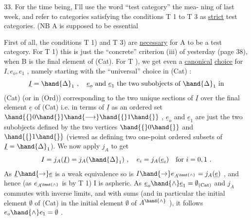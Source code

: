 33.   For the time being,  I'll use the word ``test category''  the mea-%
ning of last week,  and refer to categories satisfying the conditions
T 1 to  T 3  as \uline{strict}  test categories. (NB A is supposed to be essential

First of all,  the conditions T 1) and T 3) are \uline{necessary} for A to be
a test category.  For  T 1)  this is just the ``concrete'' criterion (iii)
of yesterday (page 38),  when B is the final element of (Cat).  For T ),
we get even a \uline{canonical} \uline{choice} for $I,e_o,e_1$ ,  namely starting with the
 ``universal'' choice in (Cat) :
\[ \underline{I} = \hand{\Delta}_1 \ , \quad \underline{e}_o \text{ and } \underline{e}_1 \text{ the two subobjects of } \hand{\Delta}_1 \text{ in} \]
(Cat) (or in (Ord)) corresponding to the
two unique sections of $\underline{I}$ over the final
element $\underline{e}$ of (Cat)\hand{,}
i.e. in terms of $\underline{I}$ as an ordered set $\hand{\{}0\hand{\}} \hand{\longrightarrow} \hand{\{}1\hand{\}}$ ,  $\underline{e}_o$ and $\underline{e}_1$ are just the
two subobjects defined by the two vertices $\hand{\{}0\hand{\}}$ and $\hand{\{}1\hand{\}}$ (viewed as defining
two one-point ordered subsets of $\underline{I} = \hand{\Delta}_1$).  We now apply $j_A$ to get
\[ I = j_A(\underline{I}) = j_A(\hand{\Delta}_1) \ , \quad e_i = j_A(\underline{e}_i) \quad \text{for } i = 0,1 \ . \]
As  $\underline{I} \hand{\to} \underline{e}$  is a weak equivalence so is $I \hand{\to} e_{A^{\hand{\wedge}}} = j_A(\underline{e})$ ,  and hence (as $e_{A^{\hand{\wedge}}}$
is  by T 1) I is aspheric.  As $\underline{e}_o \hand{\wedge} \underline{e}_1 = \emptyset_{(\mathrm{Cat})}$  and $j_A$ commutes
with inverse limits,  and with sums (and in particular   the
initial element  $\emptyset$ of (Cat) in the initial element $\emptyset$ of $A^{\hand{\wedge}}$ ), it follows
$e_o \hand{\wedge} e_1 = \emptyset$ .

